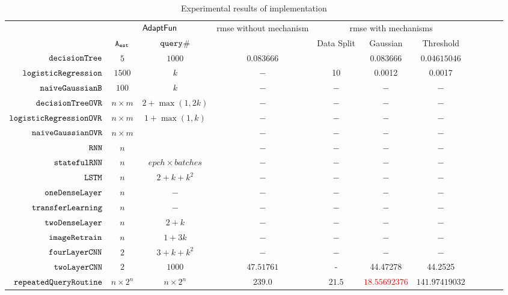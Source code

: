 {\footnotesize
\begin {table}[H]
\vspace{-0.4cm}
    \caption{Experimental results of {\THESYSTEM} implementation}
    \vspace{-0.5cm}
        \label{tb:adapt-imp}
        \begin{center}
        \centering
{\tiny
        \begin{tabular}{| >{\tiny}r | c | c | c | c | c | c | c | c | c | c  }
         \hline \hline
        \multirow{2}{*}{Program $c$}
         & \multicolumn{2}{c|}{$\textsf{AdaptFun}$}
         & \multirow{2}{*}{rmse without mechanism}
         & \multicolumn{3}{c|}{rmse with mechanisms} \\ 
         \cline{2-3} \cline{5-7}
         & {${\mathtt{A_{est}}}$ } & {${\tt query}$\# } &  & Data Split & Gaussian & Threshold  \\ 
         \cline{6-7}
         \hline \hline
         $  \mathtt{decisionTree}$ & $5$ &  $1000$ & $0.083666$  & $  $ & $0.083666$ &$0.04615046$  \\
         $  \mathtt{logisticRegression}$ & $1500$ &  $k$ & $-$  &  10 & 0.0012 & 0.0017   \\
         $  \mathtt{naiveGaussianB}$ & $100$ & $k  $ &  $ -  $  &  $-$ & $-$ & $-$ \\
         $  \mathtt{decisionTreeOVR}$ & $n\times m$ &  $2+\max(1,2k)  $ &  $ -  $  &  $-$ & $-$ & $-$ \\
         $  \mathtt{logisticRegressionOVR}$    & $n\times m$ &  $1+ \max(1, k) $ &  $ -  $  &  $-$ & $-$ & $-$ \\
         $  \mathtt{naiveGaussianOVR}$ & $n\times m$ & $ $ &  $ -  $  &  $-$ & $-$ & $-$ \\
         $  \mathtt{RNN}$ & $n$ &   $ $ &  $ -  $  &  $-$ & $-$ & $-$  \\
         $  \mathtt{statefulRNN}$ & $n$ &   $epch\times batches$ &  $ -  $  &  $-$ & $-$ & $-$ \\
         $  \mathtt{LSTM}$ & $n$ &  $ 2 + k +  k^2 $  &  $ -  $  &  $-$ & $-$ & $-$  \\
         $  \mathtt{oneDenseLayer}$ & $n$ & $ - $   &  $ -  $  &  $-$ & $-$ & $-$  \\
         {$ \mathtt{transferLearning}$} & $n$ &  $ - $ &  $ -  $  &  $-$ & $-$ & $-$ \\
         {$ \mathtt{twoDenseLayer}$} & $n$ &  $ 2 + k $ &  $ -  $  &  $-$ & $-$ & $-$  \\
         {$\mathtt{imageRetrain}$} & $n$ &  $1 + 3k $ &   $ -  $  &  $-$ & $-$ & $-$ \\
         $ \mathtt{fourLayerCNN}$ & $2$ &  $3 + k + k^2  $ &  $ -  $  &  $-$ & $-$ & $-$ \\
         $ \mathtt{twoLayerCNN}$ & $2$ &  $ 1000 $ &  $47.51761$  &  - & 44.47278 & 44.2525  \\
         $  \mathtt{repeatedQueryRoutine}$ & $ n \times 2^n $ & $  n \times 2^n $ & $239.0$   & $21.5$ & \textcolor{red}{$18.55692376$} & $141.97419032$  \\
         \hline \hline
        \end{tabular}
}
\end{center}
\end{table}
}


